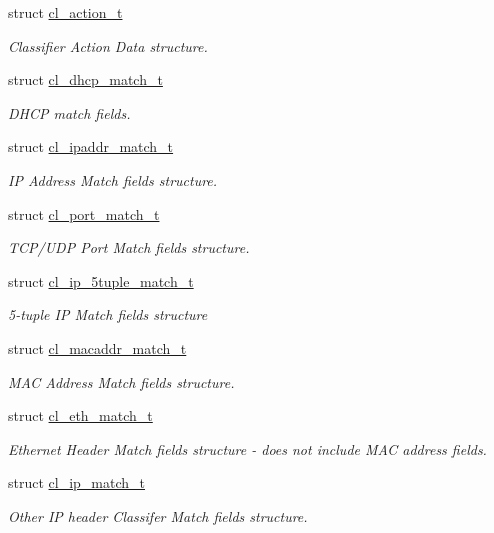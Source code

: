 \begin{DoxyCompactItemize}
struct \hyperlink{structcl__action__t}{cl\-\_\-action\-\_\-t}
\begin{DoxyCompactList}\small\item\em Classifier Action Data structure. \end{DoxyCompactList}\item 
struct \hyperlink{structcl__dhcp__match__t}{cl\-\_\-dhcp\-\_\-match\-\_\-t}
\begin{DoxyCompactList}\small\item\em D\-H\-C\-P match fields. \end{DoxyCompactList}\item 
struct \hyperlink{structcl__ipaddr__match__t}{cl\-\_\-ipaddr\-\_\-match\-\_\-t}
\begin{DoxyCompactList}\small\item\em I\-P Address Match fields structure. \end{DoxyCompactList}\item 
struct \hyperlink{structcl__port__match__t}{cl\-\_\-port\-\_\-match\-\_\-t}
\begin{DoxyCompactList}\small\item\em T\-C\-P/\-U\-D\-P Port Match fields structure. \end{DoxyCompactList}\item 
struct \hyperlink{structcl__ip__5tuple__match__t}{cl\-\_\-ip\-\_\-5tuple\-\_\-match\-\_\-t}
\begin{DoxyCompactList}\small\item\em 5-\/tuple I\-P Match fields structure \end{DoxyCompactList}\item 
struct \hyperlink{structcl__macaddr__match__t}{cl\-\_\-macaddr\-\_\-match\-\_\-t}
\begin{DoxyCompactList}\small\item\em M\-A\-C Address Match fields structure. \end{DoxyCompactList}\item 
struct \hyperlink{structcl__eth__match__t}{cl\-\_\-eth\-\_\-match\-\_\-t}
\begin{DoxyCompactList}\small\item\em Ethernet Header Match fields structure -\/ does not include M\-A\-C address fields. \end{DoxyCompactList}\item 
struct \hyperlink{structcl__ip__match__t}{cl\-\_\-ip\-\_\-match\-\_\-t}
\begin{DoxyCompactList}\small\item\em Other I\-P header Classifer Match fields structure. \end{DoxyCompactList}\item 

\end{DoxyCompactItemize}
